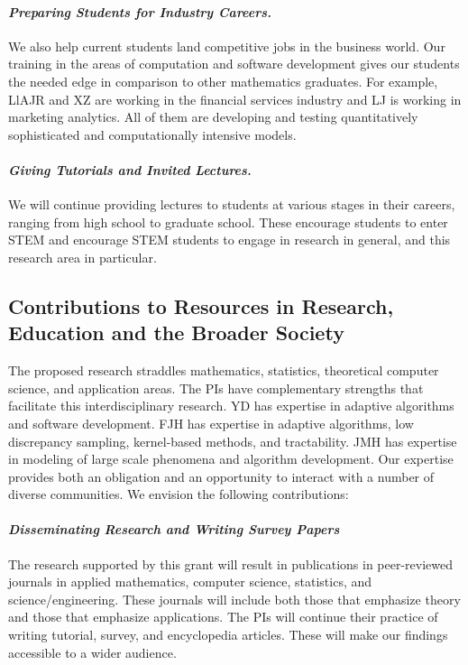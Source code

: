 \documentclass[11pt]{NSFamsart}
\newcommand{\fredparagraph}[1]{\paragraph*{\emph{#1}}}
\begin{document}
\fredparagraph{Preparing Students for Industry Careers.}
We also help current students land 
competitive jobs in the business world. Our training in the areas of computation and software 
development gives our students the needed edge in comparison to other mathematics 
graduates. For example, LlAJR and XZ are working in the financial services industry and  LJ is 
working in marketing analytics.  All of them are developing and testing quantitatively sophisticated 
and computationally intensive models. 


\fredparagraph{Giving Tutorials and Invited Lectures.}
We will continue providing lectures to students at various stages in their careers, ranging from high
school to graduate school. These encourage students to enter STEM and encourage STEM students 
to engage in research in general, and this research area in particular.


\subsection{Contributions to Resources in Research, Education and the Broader Society} 
\label{BroaderTwoSec}

The proposed research straddles mathematics, statistics, theoretical computer science, and 
application areas.  The PIs have complementary strengths that facilitate this interdisciplinary research.  YD has expertise in adaptive algorithms and software development.  FJH has expertise in adaptive algorithms, low discrepancy sampling, kernel-based methods, and tractability. JMH has expertise in modeling of large scale phenomena and algorithm development.  Our 
expertise provides both an obligation and an opportunity to interact with a number of diverse 
communities. We envision the following contributions:

\fredparagraph{Disseminating Research and Writing Survey Papers}
The research supported by this grant will result in publications in peer-reviewed journals in applied
mathematics, computer science, statistics, and science/engineering. These 
journals will include both those that emphasize theory and those that emphasize applications.  The PIs will continue their practice of writing tutorial, survey, and encyclopedia articles.  These will make our findings accessible to a wider audience.
\end{document}
